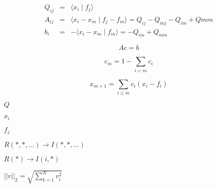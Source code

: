 \documentclass{article}
\begin{document}
\begin{eqnarray*} Q_{i j} & = & \langle x_i \mid f_j \rangle \\ A_{i j} & = & \langle x_i - x_m \mid f_j - f_m \rangle = Q_{i j} - Q_{m j} - Q_{i m} + Q{m m} \\ b_i & =& -\langle x_i - x_m \mid f_m \rangle = -Q_{i m} + Q_{m m} \end{eqnarray*}
\pagebreak

\[ A c = b \]
\pagebreak

\[ c_m = 1 - \sum_{i<m} c_i \]
\pagebreak

\[ x_{m+1} = \sum_{i \le m}{c_i ( x_i - f_i)} \]
\pagebreak

$ Q $
\pagebreak

$ x_i $
\pagebreak

$ f_j $
\pagebreak

$ R(*,*,\ldots) \rightarrow I(*,*,\ldots) $
\pagebreak

$ R(*) \rightarrow I(i,*) $
\pagebreak

$ ||v||_2 = \sqrt{\sum_{k=1}^N v_i^2} $
\pagebreak
\end{document}
